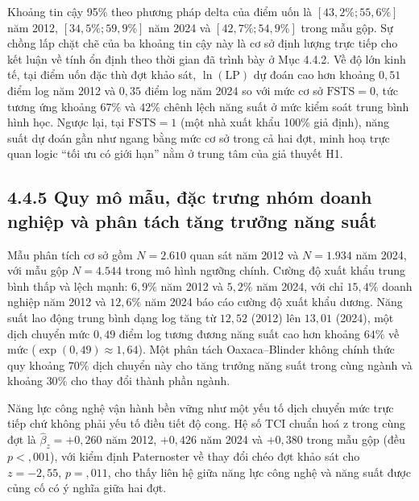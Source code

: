 \documentclass[
  a4paper,
  13pt]{extreport}
\begin{document}
Khoảng tin cậy 95\% theo phương pháp delta của điểm uốn là
\([43{,}2\%; 55{,}6\%]\) năm 2012, \([34{,}5\%; 59{,}9\%]\) năm 2024 và
\([42{,}7\%; 54{,}9\%]\) trong mẫu gộp. Sự chồng lấp chặt chẽ của ba
khoảng tin cậy này là cơ sở định lượng trực tiếp cho kết luận về tính ổn
định theo thời gian đã trình bày ở Mục 4.4.2. Về độ lớn kinh tế, tại
điểm uốn đặc thù đợt khảo sát, \(\ln(\mathrm{LP})\) dự đoán cao hơn
khoảng \(0{,}51\) điểm log năm 2012 và \(0{,}35\) điểm log năm 2024 so
với mức cơ sở \(\mathrm{FSTS} = 0\), tức tương ứng khoảng \(67\%\) và
\(42\%\) chênh lệch năng suất ở mức kiểm soát trung bình hình học. Ngược
lại, tại \(\mathrm{FSTS} = 1\) (một nhà xuất khẩu 100\% giả định), năng
suất dự đoán gần như ngang bằng mức cơ sở trong cả hai đợt, minh hoạ
trực quan logic ``tối ưu có giới hạn'' nằm ở trung tâm của giả thuyết
H1.

\hypertarget{quy-muxf4-mux1eabu-ux111ux1eb7c-trux1b0ng-nhuxf3m-doanh-nghiux1ec7p-vuxe0-phuxe2n-tuxe1ch-tux103ng-trux1b0ux1edfng-nux103ng-suux1ea5t}{%
\subsection{4.4.5 Quy mô mẫu, đặc trưng nhóm doanh nghiệp và phân tách
tăng trưởng năng
suất}\label{quy-muxf4-mux1eabu-ux111ux1eb7c-trux1b0ng-nhuxf3m-doanh-nghiux1ec7p-vuxe0-phuxe2n-tuxe1ch-tux103ng-trux1b0ux1edfng-nux103ng-suux1ea5t}}

Mẫu phân tích cơ sở gồm \(N = 2.610\) quan sát năm 2012 và \(N = 1.934\)
năm 2024, với mẫu gộp \(N = 4.544\) trong mô hình ngưỡng chính. Cường độ
xuất khẩu trung bình thấp và lệch mạnh: \(6{,}9\%\) năm 2012 và
\(5{,}2\%\) năm 2024, với chỉ \(15{,}4\%\) doanh nghiệp năm 2012 và
\(12{,}6\%\) năm 2024 báo cáo cường độ xuất khẩu dương. Năng suất lao
động trung bình dạng log tăng từ \(12{,}52\) (2012) lên \(13{,}01\)
(2024), một dịch chuyển mức \(0{,}49\) điểm log tương đương năng suất
cao hơn khoảng \(64\%\) về mức (\(\exp(0{,}49) \approx 1{,}64\)). Một
phân tách Oaxaca--Blinder không chính thức quy khoảng \(70\%\) dịch
chuyển này cho tăng trưởng năng suất trong cùng ngành và khoảng \(30\%\)
cho thay đổi thành phần ngành.

Năng lực công nghệ vận hành bền vững như một yếu tố dịch chuyển mức trực
tiếp chứ không phải yếu tố điều tiết độ cong. Hệ số TCI chuẩn hoá z
trong cùng đợt là \(\hat{\beta}_z = +0{,}260\) năm 2012, \(+0{,}426\)
năm 2024 và \(+0{,}380\) trong mẫu gộp (đều \(p < {,}001\)), với kiểm
định Paternoster về thay đổi chéo đợt khảo sát cho \(z = -2{,}55\),
\(p = {,}011\), cho thấy liên hệ giữa năng lực công nghệ và năng suất
được củng cố có ý nghĩa giữa hai đợt.
\end{document}

